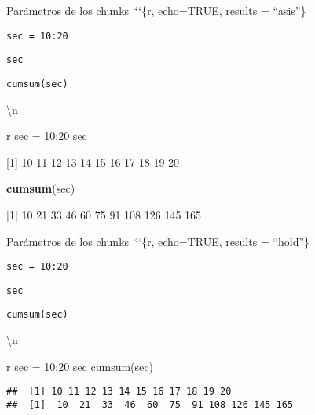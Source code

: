 \documentclass[
  ignorenonframetext,
]{beamer}
\newenvironment{Shaded}{\begin{snugshade}}{\end{snugshade}}
\newcommand{\FunctionTok}[1]{\textcolor[rgb]{0.13,0.29,0.53}{\textbf{#1}}}
\newcommand{\NormalTok}[1]{#1}
\begin{document}
\begin{frame}[fragile]{Parámetros de los chunks}
\label{paruxe1metros-de-los-chunks-4}
```\{r, echo=TRUE, results = ``asis''\}

\texttt{sec\ =\ 10:20}

\texttt{sec}

\texttt{cumsum(sec)}

\begin{Shaded}
\begin{Highlighting}[]

\NormalTok{\textbackslash{}n}


\NormalTok{\textasciigrave{}\textasciigrave{}\textasciigrave{} r}
\NormalTok{sec = 10:20}
\NormalTok{sec}
\end{Highlighting}
\end{Shaded}

{[}1{]} 10 11 12 13 14 15 16 17 18 19 20

\begin{Shaded}
\begin{Highlighting}[]
\FunctionTok{cumsum}\NormalTok{(sec)}
\end{Highlighting}
\end{Shaded}

{[}1{]} 10 21 33 46 60 75 91 108 126 145 165
\end{frame}

\begin{frame}[fragile]{Parámetros de los chunks}
\label{paruxe1metros-de-los-chunks-5}
```\{r, echo=TRUE, results = ``hold''\}

\texttt{sec\ =\ 10:20}

\texttt{sec}

\texttt{cumsum(sec)}

\begin{Shaded}
\begin{Highlighting}[]

\NormalTok{\textbackslash{}n}


\NormalTok{\textasciigrave{}\textasciigrave{}\textasciigrave{} r}
\NormalTok{sec = 10:20}
\NormalTok{sec}
\NormalTok{cumsum(sec)}
\end{Highlighting}
\end{Shaded}

\begin{verbatim}
##  [1] 10 11 12 13 14 15 16 17 18 19 20
##  [1]  10  21  33  46  60  75  91 108 126 145 165
\end{verbatim}
\end{frame}
\end{document}
